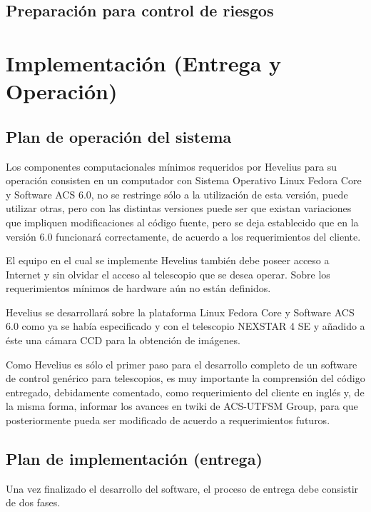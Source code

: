 \documentclass[letterpaper,spanish,10pt]{article}
\begin{document}
\subsection{Preparaci\'on para control de riesgos}



\newpage
\section{Implementaci\'on (Entrega y Operaci\'on)} %
\subsection{Plan de operaci\'on del sistema}
Los componentes computacionales m\'inimos requeridos por Hevelius para su 
operaci\'on consisten en un computador con Sistema Operativo Linux Fedora Core 
y Software ACS 6.0, no se restringe s\'olo a la utilizaci\'on de esta versi\'on, puede 
utilizar otras, pero con las distintas versiones puede ser que existan variaciones 
que impliquen modificaciones al c\'odigo fuente, pero se deja 
establecido que en la versi\'on 6.0 funcionar\'a correctamente, de acuerdo 
a los requerimientos del cliente.

El equipo en el cual se implemente Hevelius tambi\'en debe poseer acceso 
a Internet y sin olvidar el acceso al telescopio que se desea operar. Sobre 
los requerimientos m\'inimos de hardware a\'un no est\'an definidos.

Hevelius se desarrollar\'a sobre la plataforma Linux Fedora Core y Software ACS 6.0 como 
ya se hab\'ia especificado y con el telescopio NEXSTAR 4 SE y a\~nadido 
a \'este una c\'amara CCD para la obtenci\'on de im\'agenes.

Como Hevelius es s\'olo el primer paso para el desarrollo completo de un 
software de control gen\'erico para telescopios, es muy importante la 
comprensi\'on del c\'odigo entregado, debidamente comentado, como requerimiento 
del cliente en ingl\'es y, de la misma forma, informar los avances en twiki 
de ACS-UTFSM Group, para que posteriormente pueda ser modificado de acuerdo 
a requerimientos futuros.

\subsection{Plan de implementaci\'on (entrega)}
Una vez finalizado el desarrollo del software, el proceso de entrega debe 
consistir de dos fases.
\end{document}
